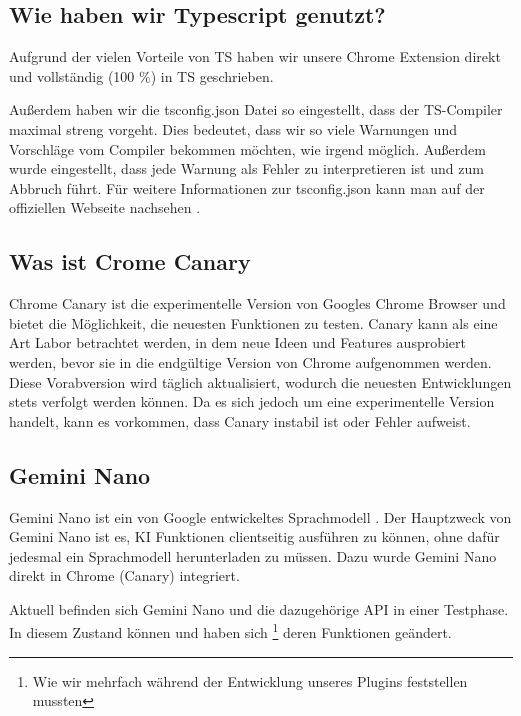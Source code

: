 \subsection{Wie haben wir Typescript genutzt?}

Aufgrund der vielen Vorteile von TS haben wir unsere Chrome Extension direkt und vollständig (100 \%) in TS geschrieben.

Außerdem haben wir die tsconfig.json Datei so eingestellt, dass der TS-Compiler maximal streng vorgeht. Dies bedeutet, dass wir so viele Warnungen und Vorschläge vom Compiler bekommen möchten, wie irgend möglich. Außerdem wurde eingestellt, dass jede Warnung als Fehler zu interpretieren ist und zum Abbruch führt. Für weitere Informationen zur tsconfig.json kann man auf der offiziellen Webseite \cite{tsconfig} nachsehen .

\subsection{Was ist Crome Canary}

Chrome Canary ist die experimentelle Version von Googles Chrome Browser und bietet die Möglichkeit, die neuesten Funktionen zu testen. Canary kann als eine Art Labor betrachtet werden, in dem neue Ideen und Features ausprobiert werden, bevor sie in die endgültige Version von Chrome aufgenommen werden. Diese Vorabversion wird täglich aktualisiert, wodurch die neuesten Entwicklungen stets verfolgt werden können. Da es sich jedoch um eine experimentelle Version handelt, kann es vorkommen, dass Canary instabil ist oder Fehler aufweist. \cite{chrome-canary}

\subsection{Gemini Nano}

Gemini Nano ist ein von Google entwickeltes Sprachmodell \cite{gemini-nano}. Der Hauptzweck von Gemini Nano ist es, KI Funktionen clientseitig ausführen zu können, ohne dafür jedesmal ein Sprachmodell herunterladen zu müssen. Dazu wurde Gemini Nano direkt in Chrome (Canary) integriert. \cite{gemini-nano-build-in-ai}

Aktuell befinden sich Gemini Nano und die dazugehörige API in einer Testphase. In diesem Zustand können und haben sich \footnote{Wie wir mehrfach während der Entwicklung unseres Plugins feststellen mussten} deren Funktionen geändert. \cite{gemini-nano-build-in-ai}


